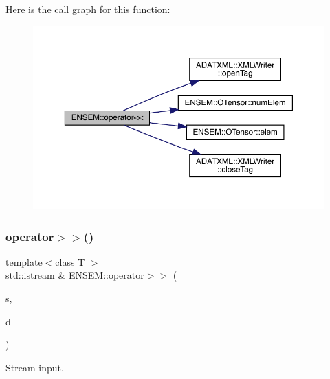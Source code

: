 Here is the call graph for this function\+:\nopagebreak
\begin{figure}[H]
\begin{center}
\leavevmode
\includegraphics[width=350pt]{de/d87/group__obstensor_gaa5233df95541acbbe7762e49152aaeb5_cgraph}
\end{center}
\end{figure}
\mbox{\label{group__obstensor_ga6a7ad5b01079729a5dee60bd7e98e6e1}} 
\subsubsection{\texorpdfstring{operator$>$$>$()}{operator>>()}\hspace{0.1cm}{\footnotesize\ttfamily [1/2]}}
{\footnotesize\ttfamily template$<$class T $>$ \\
std\+::istream \& E\+N\+S\+E\+M\+::operator$>$$>$ (\begin{DoxyParamCaption}\item[{std\+::istream \&}]{s,  }\item[{\mbox{\hyperlink{classENSEM_1_1OTensor}{O\+Tensor}}$<$ T $>$ \&}]{d }\end{DoxyParamCaption})\hspace{0.3cm}{\ttfamily [inline]}}



Stream input. 

